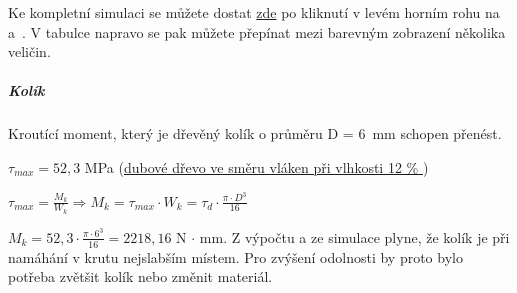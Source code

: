 Ke kompletní simulaci se můžete dostat \href{https://myhub.autodesk360.com/ue2d7aa41/g/shares/SH56a43QTfd62c1cd96843f1e03a0eb48053?viewState=NoIgbgDAdAjCA0IDeAdEAXAngBwKZoC40BlASwFsBXAGwEN1SB7AOzXjVoGdPd1C0ARjABsATlEQItALQBjcbmkAWCMIjSBuWgA5lAM22ilAVgAmMAOyy9\%2BBGkYCAVrlnoAkqcIBmAL4gAukA}{zde}
\parencite{simulase_mechnické} po kliknutí v levém horním rohu na  a~. V tabulce napravo se pak můžete přepínat mezi barevným zobrazení několika veličin.

\subparagraph{Kolík}
Kroutící moment, který je dřevěný kolík o průměru D = 6~mm schopen přenést. 

\begin{table}[h]
    \centering
    \caption{Tabulka použitých symbolu pro napětí v kolíku v krutu}
    \label{tab:M3_symboly_kolik}
\end{table}

$ \tau_{max} = 52,3 $ MPa (\href{https://is.mendelu.cz/eknihovna/opory/zobraz_cast.pl?fit_w=1;cast=9190}{dubové dřevo ve směru vláken při vlhkosti 12 \% } \parencite{pevnost_dreva})

$ \tau_{max} = \frac{M_k}{W_k} \Rightarrow M_k = \tau_{max} \cdot W_k = \tau _d \cdot \frac{\pi \cdot D^3}{16} $

$ M_k = 52,3 \cdot \frac{\pi \cdot 6^3}{16} = 2 218,16 $ N $\cdot$ mm. Z výpočtu a ze simulace plyne, že kolík je při namáhání v krutu nejslabším místem. Pro zvýšení odolnosti by proto bylo 
potřeba zvětšit kolík nebo změnit materiál.